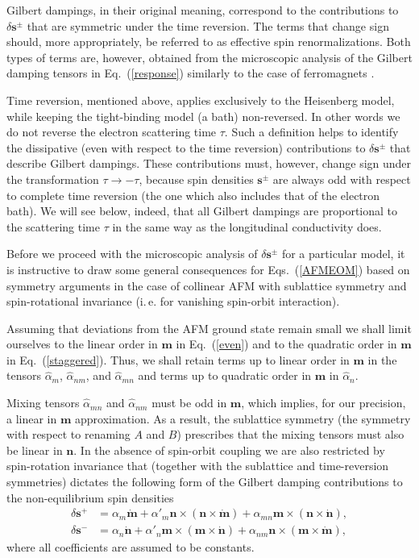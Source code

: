 \documentclass[%
  twocolumn,
  aps,
  prb,
  amsmath,
  amssymb,
  superscriptaddress,
  nofootinbib,
  floatfix
]{revtex4-1}
\newcommand{\beml}{\begin{subequations}}
\newcommand{\eml}{\end{subequations}}
\newcommand{\bb}{\boldsymbol}
\newcommand{\0}{^{\phantom{\dagger}}}
\begin{document}
Gilbert dampings, in their original meaning, correspond to the contributions to $\delta\bb{s}^{\pm}$ that are symmetric under the time reversion. 
The terms that change sign should, more appropriately, be referred to as effective spin renormalizations. Both types of terms are, however, obtained from the microscopic analysis of the Gilbert damping tensors in Eq.~(\ref{response}) similarly to the case of ferromagnets \cite{AdoSTTGD2019}.

Time reversion, mentioned above, applies exclusively to the Heisenberg model, while keeping the tight-binding model (a bath) non-reversed. In other words we do not reverse the electron scattering time $\tau$. Such a definition helps to identify the dissipative (even with respect to the time reversion) contributions to $\delta\bb{s}^{\pm}$ that describe Gilbert dampings. These contributions must, however, change sign under the transformation $\tau \to -\tau$, because spin densities $\bb{s}^\pm$ are always odd with respect to complete time reversion (the one which also includes that of the electron bath). We will see below, indeed, that all Gilbert dampings are proportional to the scattering time $\tau$ in the same way as the longitudinal conductivity does.  

Before we proceed with the microscopic analysis of $\delta\bb{s}^{\pm}$ for a particular model, it is instructive to draw some general consequences for Eqs.~(\ref{AFMEOM}) based on symmetry arguments in the case of collinear AFM with sublattice symmetry and spin-rotational invariance (i.\,e. for vanishing spin-orbit interaction).  

Assuming that deviations from the AFM ground state remain small we shall limit ourselves to the linear order in $\bb{m}$ in Eq.~(\ref{even}) and to the quadratic order in $\bb{m}$ in Eq.~(\ref{staggered}).  Thus, we shall retain terms up to linear order in $\bb{m}$ in the tensors $\hat{\alpha}_{m}$, $\hat{\alpha}_{nm}$, and $\hat{\alpha}_{mn}$ and terms up to quadratic order in $\bb{m}$ in $\hat{\alpha}_n$. 

Mixing tensors $\hat{\alpha}_{mn}$ and $\hat{\alpha}_{nm}$ must be odd in $\bb{m}$, which implies, for our precision, a linear in $\bb{m}$ approximation. As a result, the sublattice symmetry (the symmetry with respect to renaming $A$ and $B$) prescribes that the mixing tensors must also be linear in $\bb{n}$. In the absence of spin-orbit coupling we are also restricted by spin-rotation invariance that (together with the sublattice and time-reversion symmetries) dictates the following form of the Gilbert damping contributions to the non-equilibrium spin densities
\beml
\label{gen}
\begin{align}
\label{even}
\delta \bb{s}^{+} & = \alpha_m \dot{\bb{m}}  \!+\! \alpha'_m \bb{n}  \!\times\! (\bb{n} \!\times\! \dot{\bb{m}}) \!+\!\alpha_{mn}\bb{m}  \!\times\!  (\bb{n}  \!\times\!  \dot{\bb{n}}),\\
\delta \bb{s}^{-} &= \alpha_n \dot{\bb{n}} \!+\! \alpha'_n \bb{m}  \!\times\! (\bb{m} \!\times\! \dot{\bb{n}}) + \alpha_{nm} \bb{n}\!\times\!(\bb{m}\!\times\! \dot{\bb{m}}),
\label{staggered}
\end{align}
\eml
where all coefficients are assumed to be constants.  
\end{document}
